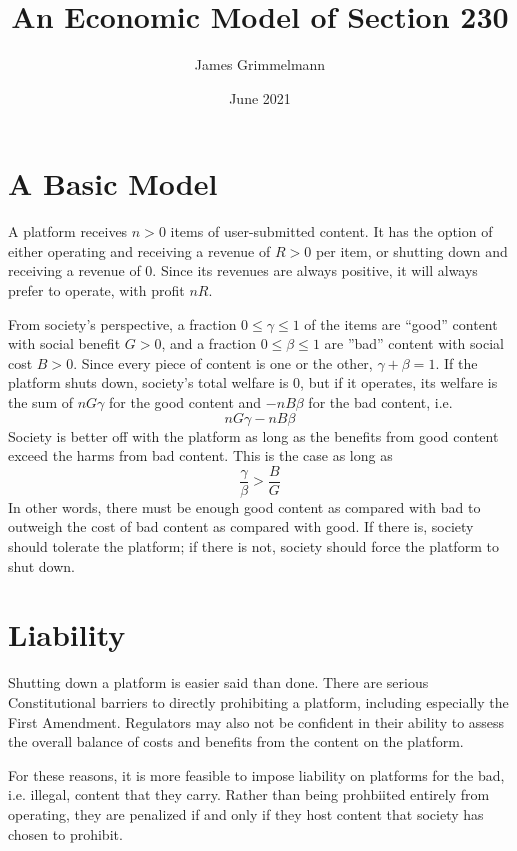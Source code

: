 \documentclass{article}
\title{An Economic Model of Section 230}
\author{James Grimmelmann}
\date{June 2021}
\begin{document}
\maketitle

\section{A Basic Model}

A platform receives $n > 0$ items of user-submitted content. It has the option of either operating and receiving a revenue of $R > 0$ per item, or shutting down and receiving a revenue of $0$. Since its revenues are always positive, it will always prefer to operate, with profit $nR$.

From society's perspective, a fraction $0 \le \gamma \le 1$ of the items are ``good'' content with social benefit $G > 0$, and a fraction $0 \le \beta \le 1$  are ''bad'' content with social cost $B > 0$. Since every piece of content is one or the other, $\gamma + \beta = 1$. If the platform shuts down, society's total welfare is $0$, but if it operates, its welfare is the sum of $nG\gamma$ for the good content and $-nB\beta$ for the bad content, i.e.
\begin{equation*}
nG\gamma - nB\beta
\end{equation*}
Society is better off with the platform as long as the benefits from good content exceed the harms from bad content. This is the case as long as
\begin{equation}
\label{shutdown1}
\frac{\gamma}{\beta} > \frac{B}{G} 
\end{equation}
In other words, there must be enough good content as compared with bad to outweigh the cost of bad content as compared with good. If there is, society should tolerate the platform; if there is not, society should force the platform to shut down.

\section{Liability}

Shutting down a platform is easier said than done. There are serious Constitutional barriers to directly prohibiting a platform, including especially the First Amendment. Regulators may also not be confident in their ability to assess the overall balance of costs and benefits from the content on the platform.

For these reasons, it is more feasible to impose liability on platforms for the bad, i.e. illegal, content that they carry. Rather than being prohbiited entirely from operating, they are penalized if and only if they host content that society has chosen to prohibit. 
\end{document}
